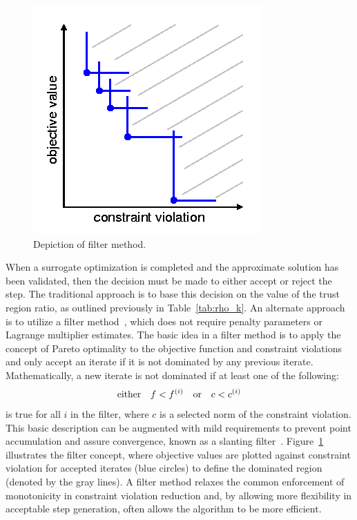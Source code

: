 \begin{figure}
  \centering
  \includegraphics[width=.3\textwidth]{images/filter}
  \caption{Depiction of filter method.}
  \label{fig:filter}
\end{figure}
When a surrogate optimization is completed and the approximate
solution has been validated, then the decision must be made to either
accept or reject the step.  The traditional approach is to base this
decision on the value of the trust region ratio, as outlined
previously in Table~\ref{tab:rho_k}.  An alternate approach is to
utilize a filter method~\cite{Fle02}, which does not require
penalty parameters or Lagrange multiplier estimates.  The basic idea
in a filter method is to apply the concept of Pareto optimality to the
objective function and constraint violations and only accept an
iterate if it is not dominated by any previous
iterate. Mathematically, a new iterate is not dominated if at least
one of the following:
\begin{equation}
{\rm either~~~} f < f^{(i)} {\rm ~~~or~~~} c < c^{(i)}
\end{equation}
is true for all $i$ in the filter, where $c$ is a selected norm of the
constraint violation.  This basic description can be augmented with
mild requirements to prevent point accumulation and assure
convergence, known as a slanting filter~\cite{Fle02}.
Figure~\ref{fig:filter} illustrates the filter concept, where
objective values are plotted against constraint violation for accepted
iterates (blue circles) to define the dominated region (denoted by the
gray lines). A filter method relaxes the common enforcement of
monotonicity in constraint violation reduction and, by allowing more
flexibility in acceptable step generation, often allows the algorithm
to be more efficient.


